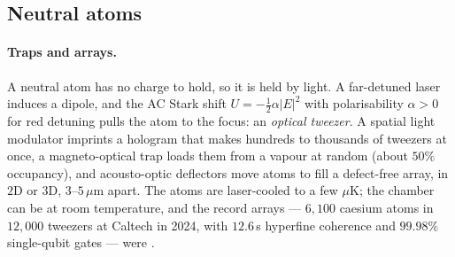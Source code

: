 \subsection{Neutral atoms}\label{ph:sec:atoms}

\paragraph{Traps and arrays.} A neutral atom has no charge to hold, so it is held by light. A
far-detuned laser induces a dipole, and the AC Stark shift $U=-\tfrac12\alpha|E|^2$ with
polarisability $\alpha>0$ for red detuning pulls the atom to the focus: an \emph{optical
tweezer}. A spatial light modulator imprints a hologram that makes hundreds to thousands of
tweezers at once, a magneto-optical trap loads them from a vapour at random (about $50\%$
occupancy), and acousto-optic deflectors move atoms to fill a defect-free array, in $2$D or $3$D,
$3$--$5\,\mu$m apart. The atoms are laser-cooled to a few $\mu$K; the chamber can be at room
temperature, and the record arrays --- $6,100$ caesium atoms in $12,000$ tweezers at Caltech in
2024, with $12.6$\,s hyperfine coherence and $99.98\%$ single-qubit gates --- were
\cite{ph:uqt26,ph:caltech6100}.

